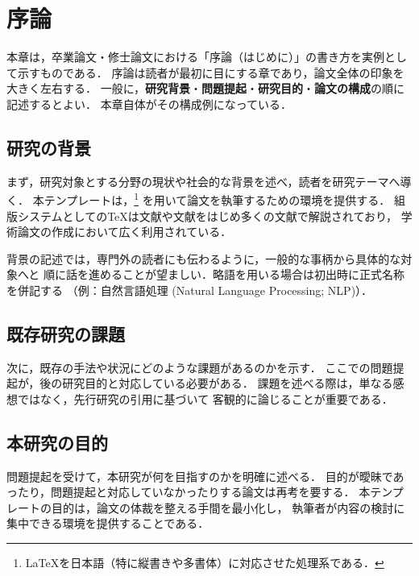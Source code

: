 \chapter{序論}
\label{chap:intro}

本章は，卒業論文・修士論文における「序論（はじめに）」の書き方を実例として示すものである．
序論は読者が最初に目にする章であり，論文全体の印象を大きく左右する．
一般に，\textbf{研究背景}・\textbf{問題提起}・\textbf{研究目的}・\textbf{論文の構成}の順に記述するとよい\cite{kisaragi}．
本章自体がその構成例になっている．

\section{研究の背景}
\label{sec:background}
まず，研究対象とする分野の現状や社会的な背景を述べ，読者を研究テーマへ導く．
本テンプレートは，\upLaTeX\footnote{\LaTeX を日本語（特に縦書きや多書体）に対応させた処理系である．}
を用いて論文を執筆するための環境を提供する．
組版システムとしての\TeX は文献\cite{lamport}や文献\cite{tex}をはじめ多くの文献で解説されており，
学術論文の作成において広く利用されている．

背景の記述では，専門外の読者にも伝わるように，一般的な事柄から具体的な対象へと
順に話を進めることが望ましい．略語を用いる場合は初出時に正式名称を併記する
（例：自然言語処理 (Natural Language Processing; NLP)）．

\section{既存研究の課題}
\label{sec:problem}
次に，既存の手法や状況にどのような課題があるのかを示す．
ここでの問題提起が，後の研究目的と対応している必要がある．
課題を述べる際は，単なる感想ではなく，先行研究の引用\cite{tex,kisaragi}に基づいて
客観的に論じることが重要である．

\section{本研究の目的}
\label{sec:purpose}
問題提起を受けて，本研究が何を目指すのかを明確に述べる．
目的が曖昧であったり，問題提起と対応していなかったりする論文は再考を要する．
本テンプレートの目的は，論文の体裁を整える手間を最小化し，
執筆者が内容の検討に集中できる環境を提供することである．

